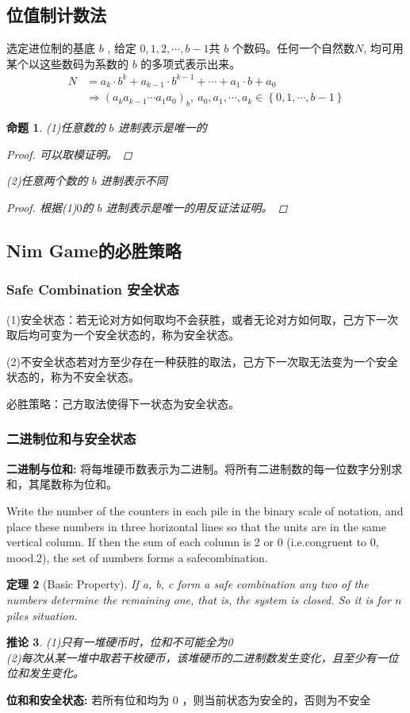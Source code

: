 \documentclass[12pt, a4paper, oneside]{ctexbook}
\newtheorem{theorem}{定理}[section]
\newtheorem{corollary}[theorem]{推论}
\newtheorem{proposition}[theorem]{命题}
\begin{document}
\subsection{位值制计数法}
选定进位制的基底 $b$ , 给定 $0,1,2,\cdots,b-1$共 $b$ 个数码。任何一个自然数$N$, 均可用某个以这些数码为系数的 $b$ 的多项式表示出来。
$$
\begin{aligned}N&=a_k\cdot b^k+a_{k-1}\cdot b^{k-1}+\cdots+a_1\cdot b+a_0\\&\Rightarrow\left(a_ka_{k-1}\cdots a_1a_0\right)_b,\:a_0,a_1,\cdots,a_k\in\left\{0,1,\cdots,b-1\right\}\end{aligned}
$$
\begin{proposition}
(1)任意数的 $b$ 进制表示是唯一的
\begin{proof}
    可以取模证明。 
\end{proof} 
(2)任意两个数的 $b$ 进制表示不同 
\begin{proof}
    根据(1)$0$的 $b$ 进制表示是唯一的用反证法证明。
\end{proof}
\end{proposition}
\subsection{Nim Game的必胜策略}
\subsubsection{Safe Combination 安全状态}
(1)安全状态：若无论对方如何取均不会获胜，或者无论对方如何取，己方下一次取后均可变为一个安全状态的，称为安全状态。

(2)不安全状态若对方至少存在一种获胜的取法，己方下一次取无法变为一个安全状态的，称为不安全状态。

必胜策略：己方取法使得下一状态为安全状态。
\subsubsection{二进制位和与安全状态}
\noindent\textbf{二进制与位和:}
将每堆硬币数表示为二进制。将所有二进制数的每一位数字分别求和，其尾数称为位和。

Write the number of the counters in each pile in the binary scale of notation,  and place these numbers in three horizontal lines so that the units are in the same vertical column. If then the sum of each column is 2 or 0 (i.e.congruent to 0, mood.2), the set of numbers forms a safecombination. 
\begin{theorem}[Basic Property]
    If a, b, c form a safe combination any two of the numbers determine the remaining one, that is, the system is closed.
    So it is for $n$ piles situation.
\end{theorem}
\begin{corollary}
    (1)只有一堆硬币时，位和不可能全为0\\
    (2)每次从某一堆中取若干枚硬币，该堆硬币的二进制数发生变化，且至少有一位位和发生变化。\\
\end{corollary} 
\noindent\textbf{位和和安全状态:}   
若所有位和均为 0 ，则当前状态为安全的，否则为不安全
\end{document}
